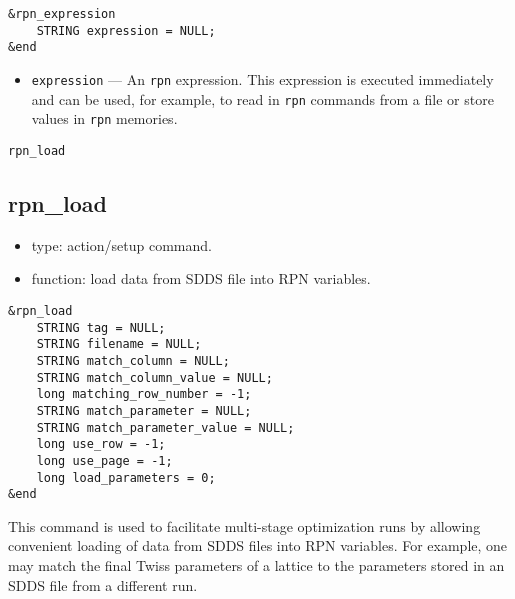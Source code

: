 \documentclass[11pt]{article}
\begin{document}
\begin{verbatim}
&rpn_expression
    STRING expression = NULL;
&end
\end{verbatim}

\begin{itemize}
\item \verb|expression| --- An {\tt rpn} expression.  This expression is executed immediately and can be
used, for example, to read in {\tt rpn} commands from a file or store values in {\tt rpn} memories.
\end{itemize}

\newpage
\begin{center}{\Large\verb|rpn_load|}\end{center}
\subsection{rpn\_load \label{subsec:rpnload}}

\begin{itemize}
\item type: action/setup command.
\item function: load data from SDDS file into RPN variables.
\end{itemize}

\begin{verbatim}
&rpn_load
    STRING tag = NULL;
    STRING filename = NULL;
    STRING match_column = NULL;
    STRING match_column_value = NULL;
    long matching_row_number = -1;
    STRING match_parameter = NULL;
    STRING match_parameter_value = NULL;
    long use_row = -1;
    long use_page = -1;
    long load_parameters = 0;
&end
\end{verbatim}

This command is used to facilitate multi-stage optimization runs by allowing convenient
loading of data from SDDS files into RPN variables.  For example, one may match the
final Twiss parameters of a lattice to the parameters stored in an SDDS file from
a different run.
\end{document}
